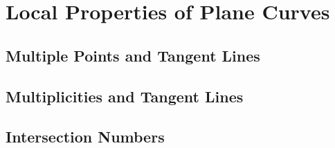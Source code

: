 \chapter{Local Properties of Plane Curves}

\section{Multiple Points and Tangent Lines}


\section{Multiplicities and Tangent Lines}

\section{Intersection Numbers}
